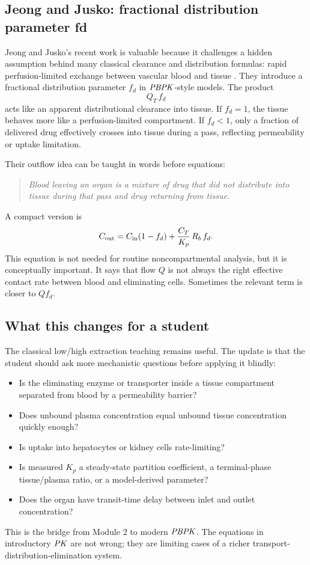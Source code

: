 \documentclass[a4paper]{article}
\newcommand{\fd}{\ensuremath{f_d}}
\newcommand{\Qt}{\ensuremath{Q_T}}
\newcommand{\Rb}{\ensuremath{R_b}}
\newcommand{\Kp}{\ensuremath{K_p}}
\newcommand{\Cin}{\ensuremath{C_{\pklab{in}}}}
\newcommand{\Cout}{\ensuremath{C_{\pklab{out}}}}
\newcommand{\Ct}{\ensuremath{C_T}}
\newcommand{\PK}{\ensuremath{\pksym{PK}}}
\newcommand{\PBPK}{\ensuremath{\pksym{PBPK}}}
\begin{document}
\subsection{Jeong and Jusko: fractional distribution parameter fd}

Jeong and Jusko's recent work is valuable because it challenges a hidden assumption behind many classical clearance and distribution formulas: rapid perfusion-limited exchange between vascular blood and tissue \cite{jeongJusko2022Fd,jeongJusko2024Clearance}. They introduce a fractional distribution parameter \(\fd\) in \PBPK{}-style models. The product
\[
  \Qt\,\fd
\]
acts like an apparent distributional clearance into tissue. If \(\fd=1\), the tissue behaves more like a perfusion-limited compartment. If \(\fd<1\), only a fraction of delivered drug effectively crosses into tissue during a pass, reflecting permeability or uptake limitation.

Their outflow idea can be taught in words before equations:
\begin{quote}
\itshape
Blood leaving an organ is a mixture of drug that did not distribute into tissue during that pass and drug returning from tissue.
\end{quote}
A compact version is
\[
  \Cout
  =
  \Cin(1-\fd)
  +
  \frac{\Ct}{\Kp}\,\Rb\,\fd.
\]
This equation is not needed for routine noncompartmental analysis, but it is conceptually important. It says that flow \(Q\) is not always the right effective contact rate between blood and eliminating cells. Sometimes the relevant term is closer to \(Q\fd\).

\subsection{What this changes for a student}

The classical low/high extraction teaching remains useful. The update is that the student should ask more mechanistic questions before applying it blindly:
\begin{itemize}[leftmargin=2em]
  \item Is the eliminating enzyme or transporter inside a tissue compartment separated from blood by a permeability barrier?
  \item Does unbound plasma concentration equal unbound tissue concentration quickly enough?
  \item Is uptake into hepatocytes or kidney cells rate-limiting?
  \item Is measured \(K_p\) a steady-state partition coefficient, a terminal-phase tissue/plasma ratio, or a model-derived parameter?
  \item Does the organ have transit-time delay between inlet and outlet concentration?
\end{itemize}
This is the bridge from Module 2 to modern \PBPK. The equations in introductory \PK{} are not wrong; they are limiting cases of a richer transport-distribution-elimination system.
\end{document}
